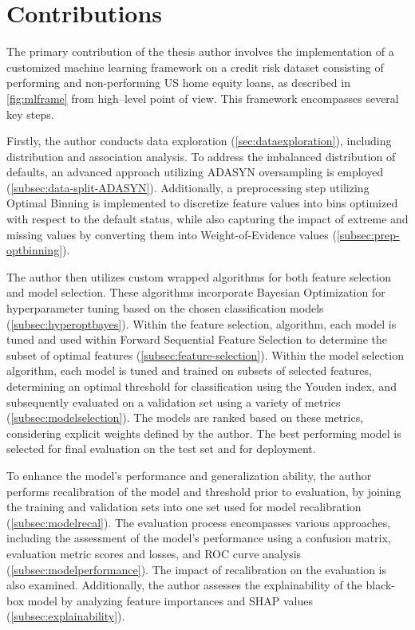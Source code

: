 \section{Contributions}
\label{sec:contributions}
The primary contribution of the thesis author involves the implementation of a customized machine learning framework on a credit risk dataset consisting of performing and non-performing US home equity loans, as described in \autoref{fig:mlframe} from high--level point of view. This framework encompasses several key steps.

Firstly, the author conducts data exploration (\autoref{sec:dataexploration}), including distribution and association analysis. To address the imbalanced distribution of defaults, an advanced approach utilizing ADASYN oversampling is employed (\autoref{subsec:data-split-ADASYN}).
Additionally, a preprocessing step utilizing Optimal Binning is implemented to discretize feature values into bins optimized with respect to the default status, while also capturing the impact of extreme and missing values by converting them into Weight-of-Evidence values (\autoref{subsec:prep-optbinning}).

The author then utilizes custom wrapped algorithms for both feature selection and model selection.
These algorithms incorporate Bayesian Optimization for hyperparameter tuning based on the chosen classification models (\autoref{subsec:hyperoptbayes}).
Within the feature selection, algorithm, each model is tuned and used within Forward Sequential Feature Selection to determine the subset of optimal features  (\autoref{subsec:feature-selection}).
Within the model selection algorithm, each model is tuned and trained on subsets of selected features, determining an optimal threshold for classification using the Youden index, and subsequently evaluated on a validation set using a variety of metrics (\autoref{subsec:modelselection}).
The models are ranked based on these metrics, considering explicit weights defined by the author.
The best performing model is selected for final evaluation on the test set and for deployment.

To enhance the model's performance and generalization ability, the author performs recalibration of the model and threshold prior to evaluation, by joining the training and validation sets into one set used for model recalibration (\autoref{subsec:modelrecal}).
The evaluation process encompasses various approaches, including the assessment of the model's performance using a confusion matrix, evaluation metric scores and losses, and ROC curve analysis (\autoref{subsec:modelperformance}).
The impact of recalibration on the evaluation is also examined.
Additionally, the author assesses the explainability of the black-box model by analyzing feature importances and SHAP values (\autoref{subsec:explainability}).

